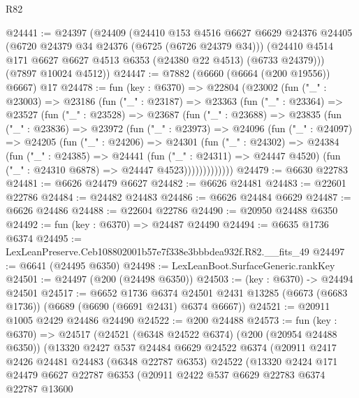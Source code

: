 \begin{lexlean}{R82}
\begin{coremodule}
@24441 := @24397
    (@24409
      (@24410
        @153
        @4516
        @6627
        @6629
        @24376
        @24405
        (@6720 @24379 @34 @24376 (@6725 (@6726 @24379 @34)))
        (@24410 @4514 @171 @6627 @6627 @4513 @6353 (@24380 @22 @4513) (@6733 @24379)))
      (@7897 @10024 @4512))
@24447 := @7882 (@6660 (@6664 (@200 @19556)) @6667) @17
@24478 := fun (key : @6370) =>
  @22804
    (@23002
      (fun ("_" : @23003) =>
      @23186
        (fun ("_" : @23187) =>
        @23363
          (fun ("_" : @23364) =>
          @23527
            (fun ("_" : @23528) =>
            @23687
              (fun ("_" : @23688) =>
              @23835
                (fun ("_" : @23836) =>
                @23972
                  (fun ("_" : @23973) =>
                  @24096
                    (fun ("_" : @24097) =>
                    @24205
                      (fun ("_" : @24206) =>
                      @24301
                        (fun ("_" : @24302) =>
                        @24384
                          (fun ("_" : @24385) =>
                          @24441
                            (fun ("_" : @24311) => @24447 @4520)
                            (fun ("_" : @24310 @6878) => @24447 @4523)))))))))))))
@24479 := @6630 @22783
@24481 := @6626 @24479 @6627
@24482 := @6626 @24481
@24483 := @22601 @22786
@24484 := @24482 @24483
@24486 := @6626 @24484 @6629
@24487 := @6626 @24486
@24488 := @22604 @22786
@24490 := @20950 @24488 @6350
@24492 := fun (key : @6370) => @24487 @24490
@24494 := @6635 @1736 @6374
@24495 := LexLeanPreserve.Ceb108802001b57e7f338e3bbbdea932f.R82.__fits_49
@24497 := @6641 (@24495 @6350)
@24498 := LexLeanBoot.SurfaceGeneric.rankKey
@24501 := @24497 (@200 (@24498 @6350))
@24503 := (key : @6370) -> @24494 @24501
@24517 := @6652
    @1736
    @6374
    @24501
    @2431
    @13285
    (@6673 (@6683 @1736))
    (@6689 (@6690 (@6691 @2431) @6374 @6667))
@24521 := @20911 @1005 @2429 @24486 @24490
@24522 := @200 @24488
@24573 := fun (key : @6370) =>
  @24517
    (@24521
      (@6348 @24522 @6374)
      (@200 (@20954 @24488 @6350))
      (@13320
        @2427
        @537
        @24484
        @6629
        @24522
        @6374
        (@20911
          @2417
          @2426
          @24481
          @24483
          (@6348 @22787 @6353)
          @24522
          (@13320
            @2424
            @171
            @24479
            @6627
            @22787
            @6353
            (@20911
              @2422
              @537
              @6629
              @22783
              @6374
              @22787
              @13600

\end{coremodule}
\end{lexlean}
